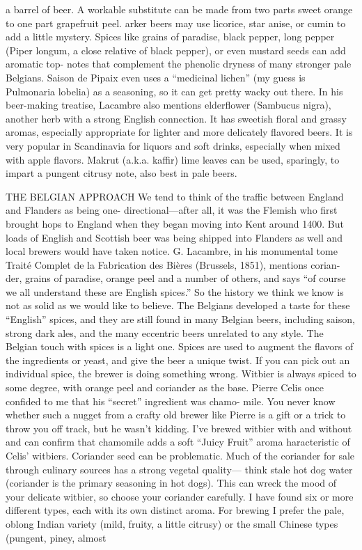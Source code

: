 \documentclass[a4paper,parskip=half]{scrartcl}
\begin{document}
a barrel of beer. A workable substitute can be made from two parts sweet
orange to one part grapefruit peel.
arker beers may use licorice, star anise, or cumin to add a little mystery.
Spices like grains of paradise, black pepper, long pepper (Piper longum, a
close relative of black pepper), or even mustard seeds can add aromatic top-
notes that complement the phenolic dryness of many stronger pale Belgians.
Saison de Pipaix even uses a “medicinal lichen” (my guess is Pulmonaria
lobelia) as a seasoning, so it can get pretty wacky out there.
In his beer-making treatise, Lacambre also mentions elderﬂower (Sambucus
nigra), another herb with a strong English connection. It has sweetish ﬂoral
and grassy aromas, especially appropriate for lighter and more delicately
ﬂavored beers. It is very popular in Scandinavia for liquors and soft drinks,
especially when mixed with apple ﬂavors. Makrut (a.k.a. kaffir) lime leaves
can be used, sparingly, to impart a pungent citrusy note, also best in pale beers.

\parencite[211]{Mosher2015}

\parencite[28\psqq]{Mosher2010}
THE BELGIAN APPROACH
We tend to think of the traffic between
England and Flanders as being one-
directional—after all, it was the Flemish
who first brought hops to England when
they began moving into Kent around
1400. But loads of English and Scottish
beer was being shipped into Flanders as
well and local brewers would have taken
notice. G. Lacambre, in his monumental
tome Traité Complet de la Fabrication des
Bières (Brussels, 1851), mentions corian-
der, grains of paradise, orange peel and a
number of others, and says “of course we
all understand these are English spices.”
So the history we think we know is not as
solid as we would like to believe.
The Belgians developed a taste for these
“English” spices, and they are still found
in many Belgian beers, including saison,
strong dark ales, and the many eccentric
beers unrelated to any style. The Belgian
touch with spices is a light one. Spices
are used to augment the flavors of the
ingredients or yeast, and give the beer
a unique twist. If you can pick out an
individual spice, the brewer is doing
something wrong.
Witbier is always spiced to some degree,
with orange peel and coriander as the
base. Pierre Celis once confided to me
that his “secret” ingredient was chamo-
mile. You never know whether such a
nugget from a crafty old brewer like Pierre
is a gift or a trick to throw you off track,
but he wasn’t kidding. I’ve brewed witbier
with and without and can confirm that
chamomile adds a soft “Juicy Fruit” aroma
haracteristic of Celis’ witbiers.
Coriander seed can be problematic. Much
of the coriander for sale through culinary
sources has a strong vegetal quality—
think stale hot dog water (coriander is the
primary seasoning in hot dogs). This can
wreck the mood of your delicate witbier,
so choose your coriander carefully. I have
found six or more different types, each
with its own distinct aroma. For brewing
I prefer the pale, oblong Indian variety
(mild, fruity, a little citrusy) or the small
Chinese types (pungent, piney, almost
\end{document}
